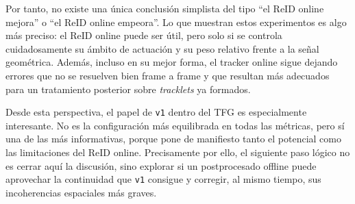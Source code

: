 \documentclass[../MAIN.tex]{subfiles}
\begin{document}
	Por tanto, no existe una única conclusión simplista del tipo ``el ReID online mejora'' o ``el ReID online empeora''. Lo que muestran estos experimentos es algo más preciso: el ReID online puede ser útil, pero solo si se controla cuidadosamente su ámbito de actuación y su peso relativo frente a la señal geométrica. Además, incluso en su mejor forma, el tracker online sigue dejando errores que no se resuelven bien frame a frame y que resultan más adecuados para un tratamiento posterior sobre \textit{tracklets} ya formados.
	
	Desde esta perspectiva, el papel de \texttt{v1} dentro del TFG es especialmente interesante. No es la configuración más equilibrada en todas las métricas, pero sí una de las más informativas, porque pone de manifiesto tanto el potencial como las limitaciones del ReID online. Precisamente por ello, el siguiente paso lógico no es cerrar aquí la discusión, sino explorar si un postprocesado offline puede aprovechar la continuidad que \texttt{v1} consigue y corregir, al mismo tiempo, sus incoherencias espaciales más graves.
	
	\newpage
	
\end{document}
